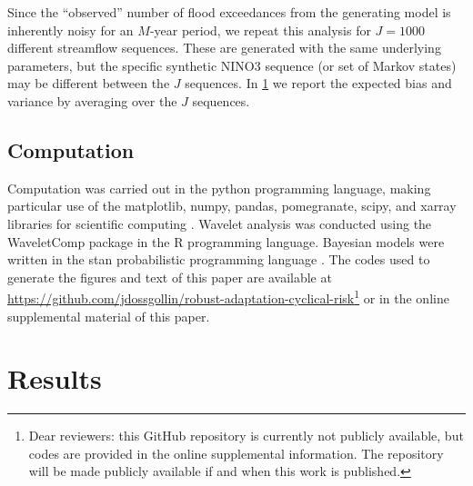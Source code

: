 \documentclass[
  draft,
  linenumbers
]{agujournal2018}
\begin{document}
Since the ``observed'' number of flood exceedances from the generating model is inherently noisy for an $M$-year period, we repeat this analysis for $J=1000$ different streamflow sequences.
These are generated with the same underlying parameters, but the specific synthetic NINO3 sequence (or set of Markov states) may be different between the $J$ sequences.
In \cref{sec:results} we report the expected bias and variance by averaging over the $J$ sequences.

\subsection{Computation}\label{sec:methods-computation}

Computation was carried out in the python programming language, making particular use of the matplotlib, numpy, pandas, pomegranate, scipy, and xarray libraries for scientific computing \citep{Hunter:2007ih, vanderWalt:2011dp, McKinney:2010un, Schreiber:2017tg, Jones:2001uv, Hoyer:2017hs}.
Wavelet analysis was conducted using the WaveletComp package \citep{Roesch:wlBQQoIs} in the R programming language.
Bayesian models were written in the stan probabilistic programming language \citep{Carpenter:2017ke}.
The codes used to generate the figures and text of this paper are available at \url{https://github.com/jdossgollin/robust-adaptation-cyclical-risk}\footnote{Dear reviewers: this GitHub repository is currently not publicly available, but codes are provided in the online supplemental information. The repository will be made publicly available if and when this work is published.} or in the online supplemental material of this paper.


\section{Results}\label{sec:results}
\end{document}
